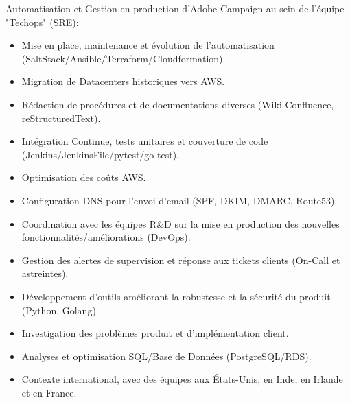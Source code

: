 \documentclass[10pt,a4paper,sans]{moderncv}        %
\begin{document}
        {}
        {}
        {}
        {Automatisation et Gestion en production d'Adobe Campaign au sein de l'équipe "Techops" (SRE):
            \begin{itemize}
            \item Mise en place, maintenance et évolution de l'automatisation (SaltStack/Ansible/Terraform/Cloudformation).
            \item Migration de Datacenters historiques vers AWS.
            \item Rédaction de procédures et de documentations diverses (Wiki Confluence, reStructuredText).
            \item Intégration Continue, tests unitaires et couverture de code (Jenkins/JenkinsFile/pytest/go test).
            \item Optimisation des coûts AWS.
            \item Configuration DNS pour l'envoi d'email (SPF, DKIM, DMARC, Route53).
            \item Coordination avec les équipes R\&D sur la mise en production des nouvelles fonctionnalités/améliorations (DevOps).
            \item Gestion des alertes de supervision et réponse aux tickets clients (On-Call et astreintes).
            \item Développement d'outils améliorant la robustesse et la sécurité du produit (Python, Golang).
            \item Investigation des problèmes produit et d'implémentation client.
            \item Analyses et optimisation SQL/Base de Données (PostgreSQL/RDS).
            \item Contexte international, avec des équipes aux États-Unis, en Inde, en Irlande et en France.
            \end{itemize}
        }
\end{document}

